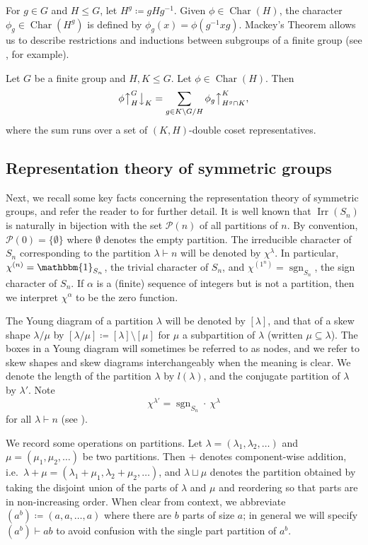 \documentclass[ALCO, Unicode]{cedram}
\newcommand{\triv}{\mathbbm{1}}
\newcommand{\Ch}{\operatorname{Char}}
\newcommand{\Irr}{\operatorname{Irr}}
\newcommand{\sgn}{\operatorname{sgn}}
\newcommand{\down}{\big\downarrow}
\newcommand{\up}{\big\uparrow}
\newcommand{\cP}{\mathcal{P}}
\begin{document}
For $g\in G$ and $H\le G$, let $H^g\coloneqq gHg^{-1}$. Given $\phi\in\Ch(H)$, the character $\phi_g\in\Ch(H^g)$ is defined by $\phi_g(x)=\phi(g^{-1}xg)$. Mackey's Theorem allows us to describe restrictions and inductions between  subgroups of a finite group (see \cite[Chapter 5]{I}, for example).
\begin{theorem}[Mackey]\label{thm:Mackey}
	Let $G$ be a finite group and $H,K\le G$. Let $\phi\in\Ch(H)$. Then
	\[ \phi\up_H^G\down_K = \sum_{g\in K\setminus G/H} \phi_g \up_{H^g\cap K}^K, \]
	where the sum runs over a set of $(K,H)$-double coset representatives.
\end{theorem}



\subsection{Representation theory of symmetric groups}\label{sec:prelims-sn}
Next, we recall some key facts concerning the representation theory of symmetric groups, and refer the reader to \cite{J,JK} for further detail.
It is well known that $\Irr(S_n)$ is naturally in bijection with the set $\cP(n)$ of all partitions of $n$. By convention, $\cP(0)=\{\emptyset\}$ where $\emptyset$ denotes the empty partition. 
The irreducible character of $S_n$ corresponding to the partition $\lambda\vdash n$ will be denoted by $\chi^\lambda$. In particular, $\chi^{(n)}=\triv_{S_n}$, the trivial character of $S_n$, and $\chi^{(1^n)}=\sgn_{S_n}$, the sign character of $S_n$. If $\alpha$ is a (finite) sequence of integers but is not a partition, then we interpret $\chi^\alpha$ to be the zero function.

The Young diagram of a partition $\lambda$ will be denoted by $[\lambda]$, and that of a skew shape $\lambda/\mu$ by $[\lambda/\mu]\coloneqq [\lambda]\setminus[\mu]$ for $\mu$ a subpartition of $\lambda$ (written $\mu\subseteq\lambda$). The boxes in a Young diagram will sometimes be referred to as nodes, and we refer to skew shapes and skew diagrams interchangeably when the meaning is clear.
We denote the length of the partition $\lambda$ by $l(\lambda)$, and the conjugate partition of $\lambda$ by $\lambda'$. Note
\begin{equation}\label{eqn:sign}
	\chi^{\lambda'}=\sgn_{S_n}\cdot\ \chi^\lambda
\end{equation}
for all $\lambda\vdash n$ (see \cite[2.1.8]{JK}). 

We record some operations on partitions. Let $\lambda=(\lambda_1,\lambda_2,\dotsc)$ and $\mu=(\mu_1,\mu_2,\dotsc)$ be two partitions. Then $+$ denotes component-wise addition, i.e.~$\lambda+\mu=(\lambda_1+\mu_1,\lambda_2+\mu_2,\dotsc)$, and $\lambda\sqcup\mu$ denotes the partition obtained by taking the disjoint union of the parts of $\lambda$ and $\mu$ and reordering so that parts are in non-increasing order.
When clear from context, we abbreviate $(a^b)\coloneqq (a,a,\dotsc,a)$ where there are $b$ parts of size $a$; in general we will specify $(a^b)\vdash ab$ to avoid confusion with the single part partition of $a^b$.
\end{document}
